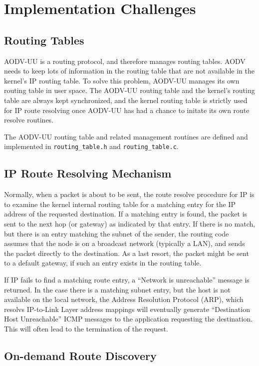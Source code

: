 \documentclass[swedish,10pt,twocolumn]{article}
\begin{document}
\section{Implementation Challenges}

\subsection{Routing Tables}

AODV-UU is a routing protocol, and therefore manages routing
tables. AODV needs to keep lots of information in the routing table
that are not available in the kernel's IP routing table. To solve this
problem, AODV-UU manages its own routing table in user space. The
AODV-UU routing table and the kernel's routing table are always kept
synchronized, and the kernel routing table is strictly used for IP
route resolving once AODV-UU has had a chance to initate its own route
resolve routines.

The AODV-UU routing table and related management routines are defined
and implemented in {\tt routing\_table.h} and {\tt routing\_table.c}.

\subsection{IP Route Resolving Mechanism}

Normally, when a packet is about to be sent, the route resolve procedure
for IP is to examine the kernel internal routing table for a matching
entry for the IP address of the requested destination. If a matching
entry is found, the packet is sent to the next hop (or gateway) as
indicated by that entry. If there is no match, but there is an entry
matching the subnet of the sender, the routing code assumes that the
node is on a broadcast network (typically a LAN), and sends the packet
directly to the destination. As a last resort, the packet might be
sent to a default gateway, if such an entry exists in the routing
table.

If IP fails to find a matching route entry, a ``Network is unreachable''
message is returned. In the case there is a matching subnet entry, but
the host is not available on the local network, the Address Resolution
Protocol (ARP), which resolvs IP-to-Link Layer address mappings will
eventually generate ``Destination Host Unreachable'' ICMP messages to
the application requesting the destination. This will often lead to
the termination of the request.

\subsection{On-demand Route Discovery}
\end{document}
